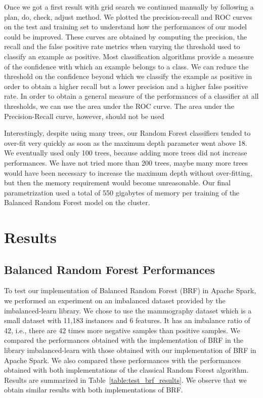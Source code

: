 \documentclass[conference]{IEEEtran}
\begin{document}
Once we got a first result with grid search we continued manually by
following a plan, do, check, adjust method. We plotted the precision-recall and ROC curves on the test and training set to understand how the performances of our model could be improved. These curves are obtained by computing the precision, the recall and the false positive rate metrics when varying the threshold used to classify an example as positive. Most classification algorithms provide a measure of the confidence with which an example belongs to a class. 
We can reduce the threshold on the confidence beyond which we classify the example as positive in order to obtain a higher recall but a lower precision and a higher false positive rate.
In order to obtain a general measure of the performances of a classifier
at all thresholds, we can use the area under the ROC curve. The area under the Precision-Recall curve, however, should not be used\cite{flach2015precision}


Interestingly, despite using many trees, our Random Forest classifiers
tended to over-fit very quickly as soon as the maximum depth parameter went
above 18. We eventually used only 100 trees, because adding more trees did
not increase performances. We have not tried more than 200 trees, maybe
many more trees would have been necessary to increase the maximum depth
without over-fitting, but then the memory requirement would become unreasonable.
Our final parametrization used a total of 550 gigabytes of memory per training of the Balanced Random Forest model on the cluster.


\section{Results}
\label{sec:results}


\subsection{Balanced Random Forest Performances}

To test our implementation of Balanced Random Forest (BRF) in Apache Spark, we performed an experiment on an imbalanced dataset provided by the imbalanced-learn library.
We chose to use the mammography dataset\cite{Woods1993} which is a small dataset with 11,183 instances and 6 features. It has an imbalance ratio of 42, i.e., there are 42 times more negative samples than positive samples. We compared the performances obtained with the implementation of BRF in the library imbalanced-learn with those obtained with our implementation of BRF in Apache Spark. We also compared these performances with the performances obtained with both implementations of the classical Random Forest algorithm.
Results are summarized in Table~\ref{table:test_brf_results}. We observe that we obtain similar results with both implementations of BRF.
\end{document}
